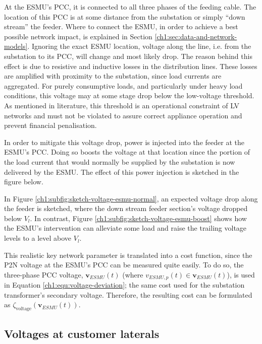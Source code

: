 At the ESMU's PCC, it is connected to all three phases of the feeding cable.
The location of this PCC is at some distance from the substation or simply ``down stream'' the feeder.
Where to connect the ESMU, in order to achieve a best possible network impact, is explained in Section \ref{ch1:sec:data-and-network-models}.
Ignoring the exact ESMU location, voltage along the line, i.e. from the substation to its PCC, will change and most likely drop.
The reason behind this effect is due to resistive and inductive losses in the distribution lines.
These losses are amplified with proximity to the substation, since load currents are aggregated.
For purely consumptive loads, and particularly under heavy load conditions, this voltage may at some stage drop below the low-voltage threshold.
As mentioned in literature, this threshold is an operational constraint of LV networks and must not be violated to assure correct appliance operation and prevent financial penalisation.

In order to mitigate this voltage drop, power is injected into the feeder at the ESMU's PCC.
Doing so boosts the voltage at that location since the portion of the load current that would normally be supplied by the substation is now delivered by the ESMU.
The effect of this power injection is sketched in the figure below.



In Figure \ref{ch1:subfig:sketch-voltage-esmu-normal}, an expected voltage drop along the feeder is sketched, where the down stream feeder section's voltage dropped below $V_l$.
In contrast, Figure \ref{ch1:subfig:sketch-voltage-esmu-boost} shows how the ESMU's intervention can alleviate some load and raise the trailing voltage levels to a level above $V_l$.

This realistic key network parameter is translated into a cost function, since the P2N voltage at the ESMU's PCC can be measured quite easily.
To do so, the three-phase PCC voltage, $\textbf{v}_{ESMU}(t)$ (where $v_{ESMU,p}(t) \in \textbf{v}_{ESMU}(t)$), is used in Equation \ref{ch1:equ:voltage-deviation}; the same cost used for the substation transformer's secondary voltage.
Therefore, the resulting cost can be formulated as $\zeta_\text{voltage}(\textbf{v}_{ESMU}(t))$.

\subsection{Voltages at customer laterals}
\label{ch1:subsec:voltages-at-customers}

